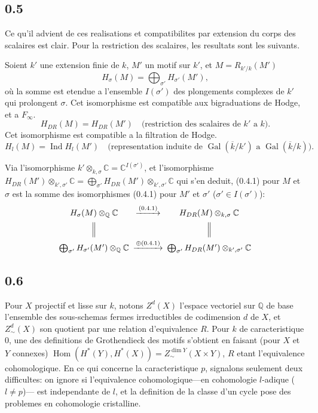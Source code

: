 \documentclass[12pt,a4paper]{article}
\theoremstyle{plain}
\theoremstyle{definition}
\theoremstyle{remark}
\DeclareMathOperator{\Hom}{Hom}
\DeclareMathOperator{\Gal}{Gal}
\DeclareMathOperator{\Ind}{Ind}
\newcommand{\Q}{\mathbb{Q}}
\newcommand{\C}{\mathbb{C}}
\begin{document}
\subsection*{0.5}

Ce qu'il advient de ces realisations et compatibilites par extension du corps des scalaires
est clair. Pour la restriction des scalaires, les resultats sont les suivants.

Soient $k'$ une extension finie de $k$, $M'$ un motif sur $k'$, et $M = R_{k'/k}(M')$
\begin{equation}\label{eq:0.5.1}
H_\sigma(M) = \bigoplus_{\sigma'} H_{\sigma'}(M'),
\end{equation}
o\`u la somme est etendue a l'ensemble $I(\sigma')$ des plongements complexes de $k'$ qui
prolongent $\sigma$. Cet isomorphisme est compatible aux bigraduations de Hodge, et a
$F_\infty$.
\begin{equation}\label{eq:0.5.2}
H_{DR}(M) = H_{DR}(M') \quad \text{(restriction des scalaires de } k' \text{ a } k \text{).}
\end{equation}
Cet isomorphisme est compatible a la filtration de Hodge.
\begin{equation}\label{eq:0.5.3}
H_l(M) = \Ind H_l(M') \quad \text{(representation induite de } \Gal(\overline{k}/k') \text{ a } \Gal(\overline{k}/k) \text{).}
\end{equation}

Via l'isomorphisme $k' \otimes_{k,\sigma} \C = \C^{I(\sigma')}$, et l'isomorphisme
$H_{DR}(M') \otimes_{k',\sigma'} \C = \bigoplus_{\sigma'} H_{DR}(M') \otimes_{k',\sigma'} \C$
qui s'en deduit, (0.4.1) pour $M$ et $\sigma$ est la somme des isomorphismes (0.4.1) pour
$M'$ et $\sigma'$ ($\sigma' \in I(\sigma')$):
\[
\begin{CD}
H_\sigma(M) \otimes_{\Q} \C @>{\text{(0.4.1)}}>> H_{DR}(M) \otimes_{k,\sigma} \C \\
@| @| \\
\bigoplus_{\sigma'} H_{\sigma'}(M') \otimes_{\Q} \C @>{\oplus \text{(0.4.1)}}>>
\bigoplus_{\sigma'} H_{DR}(M') \otimes_{k',\sigma'} \C
\end{CD}
\]


\subsection*{0.6}

Pour $X$ projectif et lisse sur $k$, notons $Z^d(X)$ l'espace vectoriel sur $\Q$ de base
l'ensemble des sous-schemas fermes irreductibles de codimension $d$ de $X$, et $Z^d_\sim(X)$
son quotient par une relation d'equivalence $R$. Pour $k$ de caracteristique $0$, une des
definitions de Grothendieck des motifs s'obtient en faisant (pour $X$ et $Y$ connexes)
$\Hom(H^*(Y), H^*(X)) = Z^{\dim Y}_\sim(X \times Y)$, $R$ etant l'equivalence cohomologique.
En ce qui concerne la caracteristique $p$, signalons seulement deux difficultes:
on ignore si l'equivalence cohomologique---en cohomologie $l$-adique ($l \neq p$)---
est independante de $l$, et la definition de la classe d'un cycle pose des problemes en
cohomologie cristalline.
\end{document}
